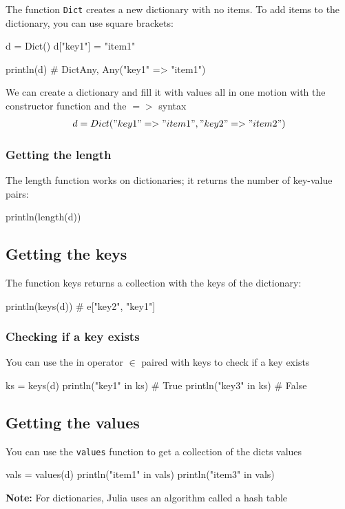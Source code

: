 \documentclass{report}
\begin{document}
     \pagebreak 
     \bigbreak \noindent 
     The function \texttt{Dict} creates a new dictionary with no items. To add items to the dictionary, you can use square brackets:
     \bigbreak \noindent 
     \begin{jlcode}
         d = Dict()
         d["key1"] = "item1"

         println(d) # Dict{Any, Any}("key1" => "item1")
     \end{jlcode}
     \bigbreak \noindent 
     We can create a dictionary and fill it with values all in one motion with the constructor function and the $=>$ syntax
     \begin{align*}
         d = Dict("key1" => "item1", "key2" => "item2")
     \end{align*}
     \bigbreak \noindent 
     \subsubsection{Getting the length}
     \bigbreak \noindent 
     The length function works on dictionaries; it returns the number of key-value pairs:
     \bigbreak \noindent 
     \begin{jlcode}
     println(length(d))
     \end{jlcode}

     \bigbreak \noindent 
     \subsection{Getting the keys}
     \bigbreak \noindent 
     The function keys returns a collection with the keys of the dictionary:
     \bigbreak \noindent 
     \begin{jlcode}
     println(keys(d)) # e["key2", "key1"]
     \end{jlcode}
     \bigbreak \noindent 
     \subsubsection{Checking if a key exists}
     \bigbreak \noindent 
     You can use the in operator $\in$ paired with keys to check if a key exists
     \bigbreak \noindent 
     \begin{jlcode}
         ks = keys(d)
         println("key1" in ks) # True
         println("key3" in ks) # False
     \end{jlcode}

     \bigbreak \noindent 
     \subsection{Getting the values}
     \bigbreak \noindent 
     You can use the \texttt{values} function to get a collection of the dicts values
     \bigbreak \noindent 
     \begin{jlcode}
         vals = values(d)
         println("item1" in vals)
         println("item3" in vals)
     \end{jlcode}
     \bigbreak \noindent 
     \textbf{Note:} For dictionaries, Julia uses an algorithm called a hash table
\end{document}
